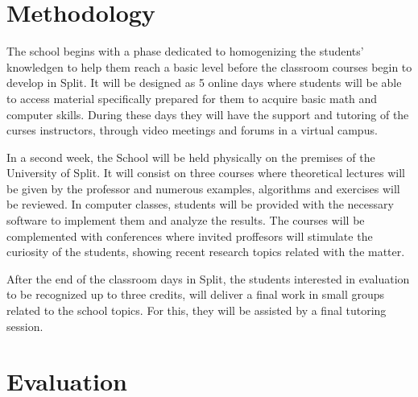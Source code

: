 \documentclass[letterpaper]{inzane_syllabus} %
\begin{document}
\vspace{0.5cm} %
\section{Methodology}

The school begins with a phase dedicated to homogenizing the students' knowledgen to help them reach a basic level before the classroom courses begin to develop in Split. It will be designed as 5 online days where students will be able to access material specifically prepared for them to acquire basic math and computer skills. During these days they will have the support and tutoring of the curses instructors, through video meetings and forums in a virtual campus.

In a second week, the School will be held physically on the premises of the University of Split. It will consist on three courses where  theoretical lectures will be given by the professor and numerous examples, algorithms and exercises will be reviewed. In computer classes, students will be provided with the necessary software to implement them and analyze the results. The courses will be complemented with conferences where invited proffesors will stimulate the curiosity of the students, showing recent research topics related with the matter.

After the end of the classroom days in Split, the students interested in evaluation to be recognized up to three credits, will deliver a final work in small groups related to the school topics. For this, they will be assisted by a final tutoring session.


\newpage %

\makeSide %



\section{Evaluation}
\end{document}
